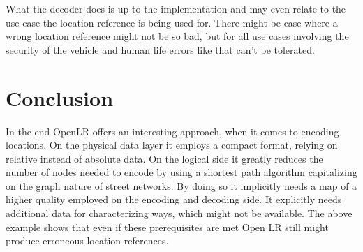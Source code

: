 What the decoder does is up to the implementation and may even relate to the use case the location reference is being used for. There might be case where a wrong location reference might not be so bad, but for all use cases involving the security of the vehicle and human life  errors like that can't be tolerated.

\section{Conclusion}
\label{sec:conclusion}

In the end OpenLR offers an interesting approach, when it comes to encoding locations. On the physical data layer it employs a compact format, relying on relative instead of absolute data. On the logical side it greatly reduces the number of nodes needed to encode by using a shortest path algorithm capitalizing on the graph nature of street networks. By doing so it implicitly needs a map of a higher quality employed on the encoding and decoding side. It explicitly needs additional data for characterizing ways, which might not be available. The above example shows that even if these prerequisites are met Open LR still might produce erroneous location references.